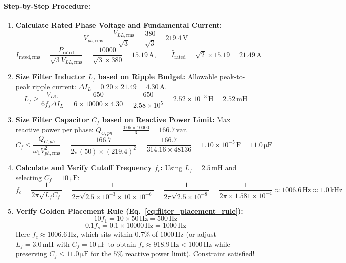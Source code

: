 \paragraph{Step-by-Step Procedure:}
\begin{enumerate}
  \item \textbf{Calculate Rated Phase Voltage and Fundamental Current:}
  \[
  V_{ph,\mathrm{rms}} = \frac{V_{LL,\mathrm{rms}}}{\sqrt{3}} = \frac{380}{\sqrt{3}} = 219.4\,\si{\volt}
  \]
  \[
  I_{\mathrm{rated,rms}} = \frac{P_{\mathrm{rated}}}{\sqrt{3} V_{LL,\mathrm{rms}}} = \frac{10000}{\sqrt{3} \times 380} = 15.19\,\si{\ampere}, \qquad \hat{I}_{\mathrm{rated}} = \sqrt{2} \times 15.19 = 21.49\,\si{\ampere}
  \]
  \item \textbf{Size Filter Inductor $L_f$ based on Ripple Budget:}
  Allowable peak-to-peak ripple current: $\Delta I_L = 0.20 \times 21.49 = 4.30\,\si{\ampere}$.
  \[
  L_f \ge \frac{V_{DC}}{6 f_s \Delta I_L} = \frac{650}{6 \times 10000 \times 4.30} = \frac{650}{2.58 \times 10^5} = 2.52 \times 10^{-3}\,\si{\henry} = 2.52\,\si{\milli\henry}
  \]
  \item \textbf{Size Filter Capacitor $C_f$ based on Reactive Power Limit:}
  Max reactive power per phase: $Q_{C,ph} = \frac{0.05 \times 10000}{3} = 166.7\,\si{\text{var}}$.
  \[
  C_f \le \frac{Q_{C,ph}}{\omega_1 V_{ph,\mathrm{rms}}^2} = \frac{166.7}{2\pi (50) \times (219.4)^2} = \frac{166.7}{314.16 \times 48136} = 1.10 \times 10^{-5}\,\si{\farad} = 11.0\,\si{\micro\farad}
  \]
  \item \textbf{Calculate and Verify Cutoff Frequency $f_c$:}
  Using $L_f = 2.5\,\si{\milli\henry}$ and selecting $C_f = 10\,\si{\micro\farad}$:
  \[
  f_c = \frac{1}{2\pi \sqrt{L_f C_f}} = \frac{1}{2\pi \sqrt{2.5 \times 10^{-3} \times 10 \times 10^{-6}}} = \frac{1}{2\pi \sqrt{2.5 \times 10^{-8}}} = \frac{1}{2\pi \times 1.581 \times 10^{-4}} \approx 1006.6\,\si{\hertz} \approx 1.0\,\si{\kilo\hertz}
  \]
  \item \textbf{Verify Golden Placement Rule (Eq.~\ref{eq:filter_placement_rule}):}
  \[
  10 f_1 = 10 \times 50\,\si{\hertz} = 500\,\si{\hertz}
  \]
  \[
  0.1 f_s = 0.1 \times 10000\,\si{\hertz} = 1000\,\si{\hertz}
  \]
  Here $f_c \approx 1006.6\,\si{\hertz}$, which sits within $0.7\%$ of $1000\,\si{\hertz}$ (or adjust $L_f = 3.0\,\si{\milli\henry}$ with $C_f = 10\,\si{\micro\farad}$ to obtain $f_c \approx 918.9\,\si{\hertz} < 1000\,\si{\hertz}$ while preserving $C_f \le 11.0\,\si{\micro\farad}$ for the $5\%$ reactive power limit). Constraint satisfied!
\end{enumerate}

